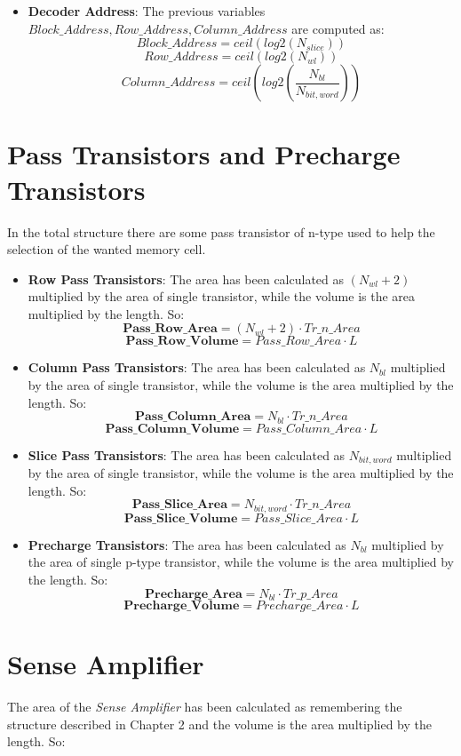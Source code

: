 \begin{itemize}
\item{\textbf{Decoder Address}}:
The previous variables $Block\_Address,Row\_Address,Column\_Address$ are computed as:
	\[
	Block\_Address = ceil(log2(N_{slice}))
	\]
	\[
	Row\_Address = ceil(log2(N_{wl}))
	\]
	\[
	Column\_Address = ceil(log2(\frac{N_{bl}}{N_{bit,word}}))
	\]
\end{itemize}
	
\section{Pass Transistors and Precharge Transistors}
In the total structure there are some pass transistor of n-type used to help the selection of the wanted memory cell.
\begin{itemize}
\item{\textbf{Row Pass Transistors}}:
The area has been calculated as $(N_{wl}+2)$ multiplied by the area of single transistor, while the volume is the area multiplied by the length. So:
	\[
	\textbf{Pass\_Row\_Area} = (N_{wl}+2) \cdot Tr\_n\_Area
	\]
	\[
	\textbf{Pass\_Row\_Volume} = Pass\_Row\_Area \cdot L
	\]
\item{\textbf{Column Pass Transistors}}:
The area has been calculated as $N_{bl}$ multiplied by the area of single transistor, while the volume is the area multiplied by the length. So: 
	\[
	\textbf{Pass\_Column\_Area} = N_{bl} \cdot Tr\_n\_Area
	\]
	\[
	\textbf{Pass\_Column\_Volume} = Pass\_Column\_Area \cdot L
	\]
\item{\textbf{Slice Pass Transistors}}:
The area has been calculated as $N_{bit,word}$ multiplied by the area of single transistor, while the volume is the area multiplied by the length. So:
	\[
	\textbf{Pass\_Slice\_Area} = N_{bit,word} \cdot Tr\_n\_Area
	\]
	\[
	\textbf{Pass\_Slice\_Volume} = Pass\_Slice\_Area \cdot L
	\]
\item{\textbf{Precharge Transistors}}:
The area has been calculated as $N_{bl}$ multiplied by the area of single p-type transistor, while the volume is the area multiplied by the length. So:
	\[
	\textbf{Precharge\_Area} = N_{bl} \cdot Tr\_p\_Area
	\]
	\[
	\textbf{Precharge\_Volume} = Precharge\_Area \cdot L
	\]
\end{itemize}

\section{Sense Amplifier}
The area of the \textit{Sense Amplifier} has been calculated as remembering the structure described in Chapter 2 and the volume is the area multiplied by the length. So:

